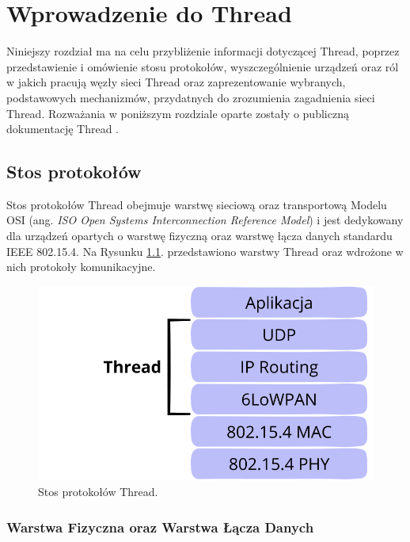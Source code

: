 \chapter{Wprowadzenie do Thread}
\label{cha:wprowadzenie}

Niniejszy rozdział ma na celu przybliżenie informacji dotyczącej Thread, poprzez przedstawienie i omówienie stosu protokołów, wyszczególnienie urządzeń oraz ról w jakich pracują węzły sieci Thread oraz zaprezentowanie wybranych, podstawowych mechanizmów, przydatnych do zrozumienia zagadnienia sieci Thread. Rozważania w poniższym rozdziale oparte zostały o publiczną dokumentację Thread \cite{thread-1.3.0}.

\section{Stos protokołów}
\label{sec:thread-stack}

    Stos protokołów Thread obejmuje warstwę sieciową oraz transportową Modelu OSI (ang. \textit{ISO Open Systems Interconnection Reference Model}) i jest dedykowany dla urządzeń opartych o warstwę fizyczną oraz warstwę łącza danych standardu IEEE 802.15.4. Na Rysunku \ref{fig:thread-sprotocol-stack}. przedstawiono warstwy Thread oraz wdrożone w nich protokoły komunikacyjne.

    \begin{figure}[H]
        \centering
        \includegraphics[width=0.8\linewidth]{graphics/thread-protocol-stack.png}
        \caption{Stos protokołów Thread.}
        \label{fig:thread-sprotocol-stack}
    \end{figure}

    \subsection{Warstwa Fizyczna oraz Warstwa Łącza Danych}

